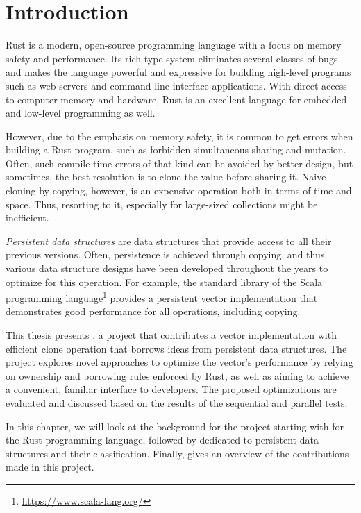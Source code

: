 \chapter{Introduction}

Rust is a modern, open-source programming language with a focus on memory safety and performance. Its rich type system eliminates several classes of bugs and makes the language powerful and expressive for building high-level programs such as web servers and command-line interface applications. With direct access to computer memory and hardware, Rust is an excellent language for embedded and low-level programming as well.

However, due to the emphasis on memory safety, it is common to get errors when building a Rust program, such as forbidden simultaneous sharing and mutation. Often, such compile-time errors of that kind can be avoided by better design, but sometimes, the best resolution is to clone the value before sharing it. Naive cloning by copying, however, is an expensive operation both in terms of time and space. Thus, resorting to it, especially for large-sized collections might be inefficient.

\emph{Persistent data structures} are data structures that provide access to all their previous versions. Often, persistence is achieved through copying, and thus, various data structure designs have been developed throughout the years to optimize for this operation. For example, the standard library of the Scala programming language\footnote{\url{https://www.scala-lang.org/}} provides a persistent vector implementation that demonstrates good performance for all operations, including copying.

This thesis presents \pvecrs{}, a project that contributes a vector implementation with efficient clone operation that borrows ideas from persistent data structures. The project explores novel approaches to optimize the vector's performance by relying on ownership and borrowing rules enforced by Rust, as well as aiming to achieve a convenient, familiar interface to developers. The proposed optimizations are evaluated and discussed based on the results of the sequential and parallel tests.

In this chapter, we will look at the background for the \pvecrs{} project starting with  for the Rust programming language, followed by  dedicated to persistent data structures and their classification. Finally,  gives an overview of the contributions made in this project.

